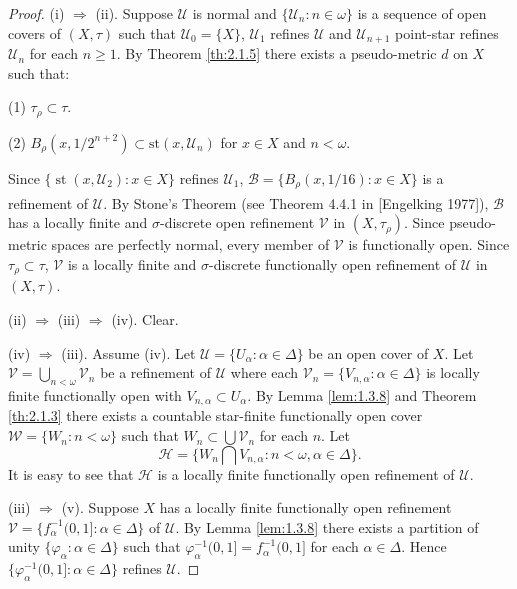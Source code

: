 \documentclass[main.tex]{subfiles}
\begin{document}
\begin{proof} (i) $\Rightarrow$ (ii).
Suppose $\mathscr{U}$ is normal and $\{\mathscr{U}_n: n\in\omega\}$ is a sequence of 
open covers of $(X, \tau)$ such that $\mathscr{U}_0 = \{X\}$, 
$\mathscr{U}_1$ 
refines $\mathscr{U}$ and $\mathscr{U}_{n+1}$ point-star refines 
$\mathscr{U}_n$ for each $n \ge 1$.
By Theorem \ref{th:2.1.5} there exists a pseudo-metric $d$ on $X$ such that:

(1) $\tau_\rho \subset \tau$.

(2) $B_\rho(x, 1/{2^{n+2}}) \subset \text{st}(x, \mathscr{U}_n)$ for $x \in X$ and $n < \omega$.

\noindent Since $\{\operatorname{st}(x, \mathscr{U}_2): x \in X\}$ refines $\mathscr{U}_1$, 
$\mathscr{B} = \{B_\rho(x, 1/{16}): x \in X\}$ is a refinement of $\mathscr{U}$. 
By Stone's Theorem (see Theorem 4.4.1 in 
[Engelking 1977]\textsuperscript{\cite{Engelking}}),  %
$\mathscr{B}$ has a locally finite  and $\sigma$-discrete open refinement 
$\mathscr{V}$ in $(X, \tau_\rho)$. Since pseudo-metric spaces are perfectly normal, 
every member of $\mathscr{V}$ is functionally open. 
Since $\tau_\rho \subset \tau$, $\mathscr{V}$ is a locally finite 
and $\sigma$-discrete functionally open refinement of $\mathscr{U}$ in $(X, \tau)$.

(ii) $\Rightarrow$ (iii) $\Rightarrow$ (iv).
Clear.

(iv) $\Rightarrow$ (iii). 
Assume (iv). Let $\mathscr{U} = \{U_\alpha: \alpha \in \Delta\}$ be an open cover of $X$. 
Let $\mathscr{V} = \bigcup_{n < \omega} \mathscr{V}_n$ be 
a refinement of $\mathscr{U}$ where each $\mathscr{V}_n = \{V_{n,\alpha}: \alpha \in \Delta\}$
 is locally finite functionally open with $V_{n,\alpha} \subset U_\alpha$.
By Lemma \ref{lem:1.3.8} and Theorem \ref{th:2.1.3} 
there exists a countable star-finite functionally open cover 
$\mathscr{W} = \{W_n: n < \omega\}$ such that 
$W_n\subset \bigcup\mathscr{V}_n$ for each $n$.
Let
$$\mathscr{H} = \{W_n \bigcap V_{n, \alpha}: n < \omega, \alpha \in \Delta\}.$$
It is easy to see that $\mathscr{H}$ is a locally finite 
functionally open refinement of $\mathscr{U}$.

(iii) $\Rightarrow$ (v).
Suppose $X$ has a locally finite functionally open 
refinement $\mathscr{V} = \{f^{-1}_\alpha(0, 1]: \alpha \in \Delta\}$ of $\mathscr{U}$. 
By Lemma \ref{lem:1.3.8} there exists a partition of unity 
$\{\varphi_\alpha: \alpha \in \Delta\}$ 
such that $\varphi_\alpha^{-1}(0, 1] = f_\alpha^{-1}(0, 1]$ 
for each $\alpha \in \Delta$. 
Hence $\{\varphi_\alpha^{-1}(0, 1]: \alpha \in \Delta\}$ refines $\mathscr{U}$.


\end{proof}
\end{document}
